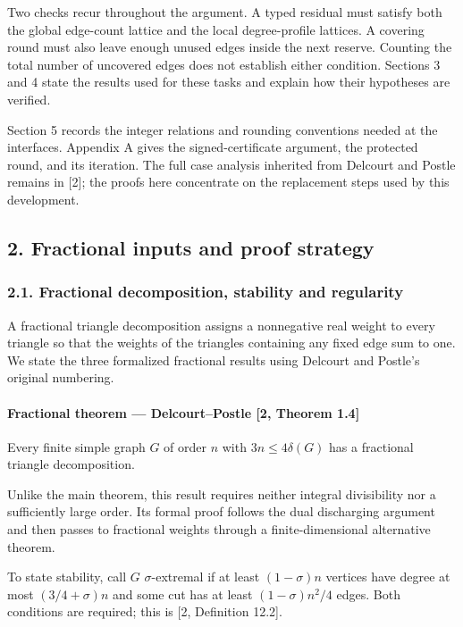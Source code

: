 \documentclass[english,11pt,a4paper]{article}
\begin{document}
Two checks recur throughout the argument. A typed residual must satisfy both the global edge-count lattice and the local degree-profile lattices. A covering round must also leave enough unused edges inside the next reserve. Counting the total number of uncovered edges does not establish either condition. Sections 3 and 4 state the results used for these tasks and explain how their hypotheses are verified.

Section 5 records the integer relations and rounding conventions needed at the interfaces. Appendix A gives the signed-certificate argument, the protected round, and its iteration. The full case analysis inherited from Delcourt and Postle remains in {[}2{]}; the proofs here concentrate on the replacement steps used by this development.


\subsection{2. Fractional inputs and proof strategy}\label{fractional-inputs-and-proof-strategy}

\subsubsection{2.1. Fractional decomposition, stability and regularity}\label{fractional-decomposition-stability-and-regularity}

A fractional triangle decomposition assigns a nonnegative real weight to every triangle so that the weights of the triangles containing any fixed edge sum to one. We state the three formalized fractional results using Delcourt and Postle's original numbering.

\paragraph{Fractional theorem --- Delcourt--Postle {[}2, Theorem 1.4{]}}\label{fractional-theorem-delcourtpostle-2-theorem-1.4}

Every finite simple graph \(G\) of order \(n\) with \(3n\le4\delta(G)\) has a fractional triangle decomposition.

Unlike the main theorem, this result requires neither integral divisibility nor a sufficiently large order. Its formal proof follows the dual discharging argument and then passes to fractional weights through a finite-dimensional alternative theorem.

To state stability, call \(G\) \(\sigma\)-extremal if at least \((1-\sigma)n\) vertices have degree at most \((3/4+\sigma)n\) and some cut has at least \((1-\sigma)n^2/4\) edges. Both conditions are required; this is {[}2, Definition 12.2{]}.
\end{document}
